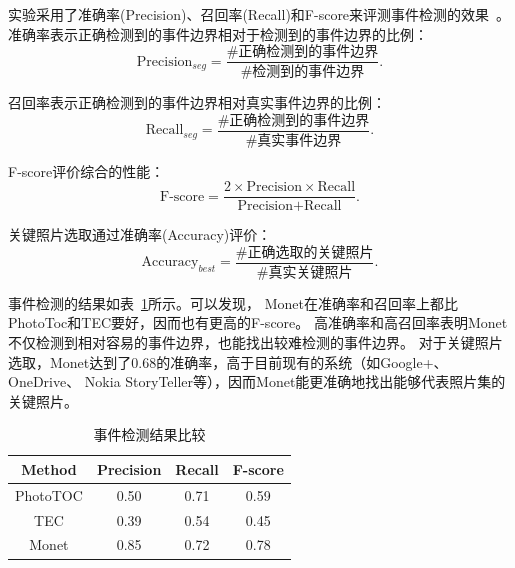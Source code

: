 \documentclass[doctor]{ustcthesis}
\begin{document}
实验采用了准确率(Precision)、召回率(Recall)和F-score来评测事件检测的效果~\cite{cooper2005temporal}。
准确率表示正确检测到的事件边界相对于检测到的事件边界的比例：
\begin{equation}
    {\text{Precision}}_{seg}=\frac{\text{\#正确检测到的事件边界}}{\text{\#检测到的事件边界}}.
\end{equation}

召回率表示正确检测到的事件边界相对真实事件边界的比例：
\begin{equation}
    {\text{Recall}}_{seg}=\frac{\text{\#正确检测到的事件边界}}{\text{\#真实事件边界}}.
\end{equation}

F-score评价综合的性能：
\begin{equation}
    \text{F-score}=\frac{2\times \text{Precision} \times \text{Recall}}{\text{Precision} + \text{Recall}}.
\end{equation}

关键照片选取通过准确率(Accuracy)评价：
\begin{equation}
    \text{Accuracy}_{best} =\frac{\text{\#正确选取的关键照片}}{\text{\#真实关键照片}}.
\end{equation}

事件检测的结果如表~\ref{tab:monet-event-seg-res}所示。可以发现，
Monet在准确率和召回率上都比PhotoToc和TEC要好，因而也有更高的F-score。
高准确率和高召回率表明Monet不仅检测到相对容易的事件边界，也能找出较难检测的事件边界。
对于关键照片选取，Monet达到了$0.68$的准确率，高于目前现有的系统（如Google+、OneDrive、
Nokia StoryTeller等），因而Monet能更准确地找出能够代表照片集的关键照片。
\begin{table}[htbp]
    \centering
    \caption{事件检测结果比较}
    \label{tab:monet-event-seg-res}
    \begin{tabular}{|c|c|c|c|}
        \hline
        Method          & Precision     & Recall    & F-score \\
        \hline
        PhotoTOC\cite{platt2003phototoc} & 0.50          & 0.71      & 0.59 \\
        \hline
        TEC\cite{cooper2005temporal}      & 0.39          & 0.54      & 0.45 \\
        \hline
        Monet                    & 0.85     &   0.72    & 0.78 \\
        \hline
    \end{tabular}
    \vspace{-2em}
\end{table}
\end{document}

